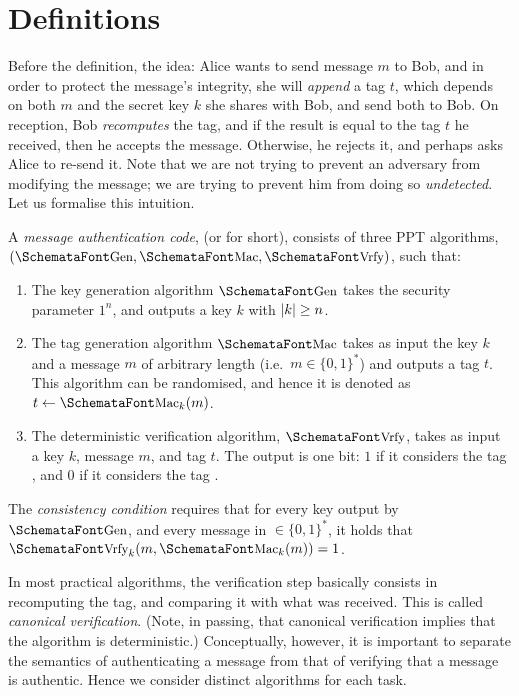\section{Definitions}
  \label{sec:macs_definitions}
  Before the definition, the idea: Alice wants to send message $m$ to Bob, and in order to protect the message's integrity, she will \emph{append} a tag $t$, which depends on both $m$ and the secret key $k$ she shares with Bob, and send both to Bob. On reception, Bob \emph{recomputes} the tag, and if the result is equal to the tag $t$ he received, then he accepts the message. Otherwise, he rejects it, and perhaps asks Alice to re-send it. Note that we are not trying to prevent an adversary from modifying the message; we are trying to prevent him from doing so \emph{undetected}. Let us formalise this intuition.
  \begin{definition}
    \label{def:mac}
    A \emph{message authentication code}, (or  for short), consists of three PPT algorithms, $(\myemph{Gen}, \myemph{Mac}, \myemph{Vrfy})$, such that:
    \begin{enumerate}
      \item The key generation algorithm $\myemph{Gen}$ takes the security parameter $1^n$, and outputs a key $k$ with $\lvert k\rvert \ge n$.
      \item The tag generation algorithm $\myemph{Mac}$ takes as input the key $k$ and a message $m$ of arbitrary length (i.e.\ $m\in \{0, 1\}^*$) and outputs a tag $t$. This algorithm can be randomised, and hence it is denoted as $t \leftarrow \myemph{Mac}_k(m)$.
      \item The deterministic verification algorithm, $\myemph{Vrfy}$, takes as input a key $k$, message $m$, and tag $t$. The output is one bit: $1$ if it considers the tag , and $0$ if it considers the tag .
    \end{enumerate}
    The \emph{consistency condition} requires that for every key output by $\myemph{Gen}$, and every message in $\in \{0, 1\}^*$, it holds that $\myemph{Vrfy}_k(m, \myemph{Mac}_k(m)) = 1$.
  \end{definition}
  
   In most practical algorithms, the verification step basically consists in recomputing the tag, and comparing it with what was received. This is called \emph{canonical verification}. (Note, in passing, that canonical verification implies that the  algorithm is deterministic.) Conceptually, however, it is important to separate the semantics of authenticating a message from that of verifying that a message is authentic. Hence we consider distinct algorithms for each task.

